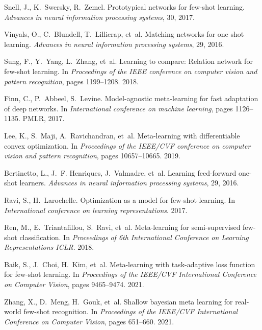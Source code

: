 \documentclass{article}
\begin{document}
\begin{thebibliography}{10}
	
	Snell, J., K.~Swersky, R.~Zemel.
	\newblock Prototypical networks for few-shot learning.
	\newblock \emph{Advances in neural information processing systems}, 30, 2017.
	
	Vinyals, O., C.~Blundell, T.~Lillicrap, et~al.
	\newblock Matching networks for one shot learning.
	\newblock \emph{Advances in neural information processing systems}, 29, 2016.
	
	Sung, F., Y.~Yang, L.~Zhang, et~al.
	\newblock Learning to compare: Relation network for few-shot learning.
	\newblock In \emph{Proceedings of the IEEE conference on computer vision and
		pattern recognition}, pages 1199--1208. 2018.
	
	Finn, C., P.~Abbeel, S.~Levine.
	\newblock Model-agnostic meta-learning for fast adaptation of deep networks.
	\newblock In \emph{International conference on machine learning}, pages
	1126--1135. PMLR, 2017.
	
	Lee, K., S.~Maji, A.~Ravichandran, et~al.
	\newblock Meta-learning with differentiable convex optimization.
	\newblock In \emph{Proceedings of the IEEE/CVF conference on computer vision
		and pattern recognition}, pages 10657--10665. 2019.
	
	Bertinetto, L., J.~F. Henriques, J.~Valmadre, et~al.
	\newblock Learning feed-forward one-shot learners.
	\newblock \emph{Advances in neural information processing systems}, 29, 2016.
	
	Ravi, S., H.~Larochelle.
	\newblock Optimization as a model for few-shot learning.
	\newblock In \emph{International conference on learning representations}. 2017.
	
	Ren, M., E.~Triantafillou, S.~Ravi, et~al.
	\newblock Meta-learning for semi-supervised few-shot classification.
	\newblock In \emph{Proceedings of 6th International Conference on Learning
		Representations {ICLR}}. 2018.
	
	Baik, S., J.~Choi, H.~Kim, et~al.
	\newblock Meta-learning with task-adaptive loss function for few-shot learning.
	\newblock In \emph{Proceedings of the IEEE/CVF International Conference on
		Computer Vision}, pages 9465--9474. 2021.
	
	Zhang, X., D.~Meng, H.~Gouk, et~al.
	\newblock Shallow bayesian meta learning for real-world few-shot recognition.
	\newblock In \emph{Proceedings of the IEEE/CVF International Conference on
		Computer Vision}, pages 651--660. 2021.
	

\end{thebibliography}
\end{document}
